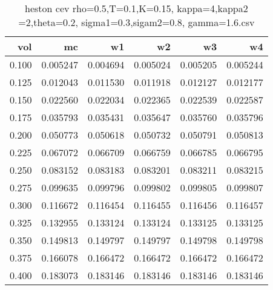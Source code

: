 \begin{table}
  \centering
  \caption{heston cev rho=0.5,T=0.1,K=0.15, kappa=4,kappa2 =2,theta=0.2, sigma1=0.3,sigam2=0.8, gamma=1.6.csv}
  \begin{tabular}{rrrrrr}
  \toprule
    vol &       mc &       w1 &       w2 &       w3 &       w4 \\
  \midrule
  0.100 & 0.005247 & 0.004694 & 0.005024 & 0.005205 & 0.005244 \\
  0.125 & 0.012043 & 0.011530 & 0.011918 & 0.012127 & 0.012177 \\
  0.150 & 0.022560 & 0.022034 & 0.022365 & 0.022539 & 0.022587 \\
  0.175 & 0.035793 & 0.035431 & 0.035647 & 0.035760 & 0.035796 \\
  0.200 & 0.050773 & 0.050618 & 0.050732 & 0.050791 & 0.050813 \\
  0.225 & 0.067072 & 0.066709 & 0.066759 & 0.066785 & 0.066795 \\
  0.250 & 0.083152 & 0.083183 & 0.083201 & 0.083211 & 0.083215 \\
  0.275 & 0.099635 & 0.099796 & 0.099802 & 0.099805 & 0.099807 \\
  0.300 & 0.116672 & 0.116454 & 0.116455 & 0.116456 & 0.116457 \\
  0.325 & 0.132955 & 0.133124 & 0.133124 & 0.133125 & 0.133125 \\
  0.350 & 0.149813 & 0.149797 & 0.149797 & 0.149798 & 0.149798 \\
  0.375 & 0.166078 & 0.166472 & 0.166472 & 0.166472 & 0.166472 \\
  0.400 & 0.183073 & 0.183146 & 0.183146 & 0.183146 & 0.183146 \\
  \bottomrule
  \end{tabular}
  \end{table}

